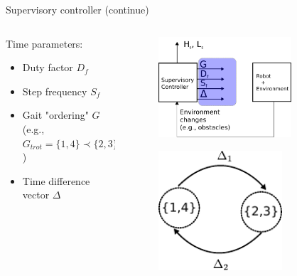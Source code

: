 \documentclass{beamer}
\begin{document}
\begin{frame}{Supervisory controller (continue)}
		\begin{columns}
		\hspace{1cm}
		\begin{column}{0.5\textwidth}
		Time parameters:
		\begin{itemize}
			\setlength\itemsep{3em}
			\item Duty factor $D_f$
			\item Step frequency $S_f$
			\item Gait "ordering" $G$ (e.g., $G_{trot}=\{1,4\}\prec\{2,3\}$)
			\item Time difference vector $\Delta$
		\end{itemize}	
		
		\end{column}
		\begin{column}{0.5\textwidth}
			\begin{figure}[ht]\centering
				\includegraphics[width=0.75\textwidth]{images/Supervisoryb.pdf}
			\end{figure}
			\begin{figure}[ht]\centering
				\includegraphics[width=0.7\textwidth]{images/TrotTime.pdf}
			\end{figure}
		\end{column}
		\end{columns}
\end{frame}
\end{document}
